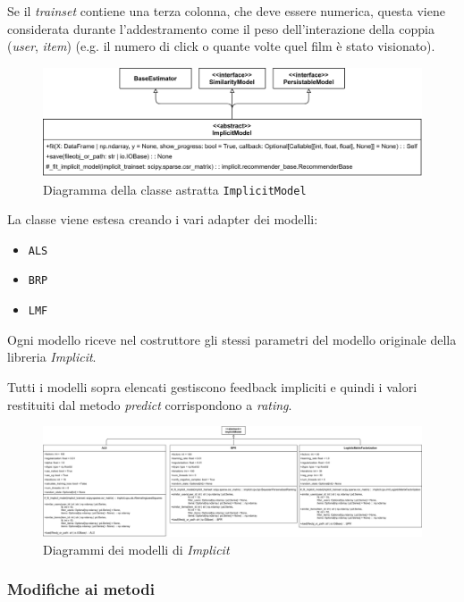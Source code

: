 Se il \textit{trainset} contiene una terza colonna, che deve essere numerica, questa viene considerata durante l'addestramento come il peso dell'interazione della coppia (\textit{user}, \textit{item}) (e.g. il numero di click o quante volte quel film è stato visionato). 

\begin{figure}[H]
    \centering
    \includegraphics[scale=0.15]{figures/UML/models/implicit_model.png}
    \caption{Diagramma della classe astratta \texttt{ImplicitModel}}
\end{figure}

La classe viene estesa creando i vari adapter dei modelli:

\begin{itemize}
    \item \texttt{ALS}
    \item \texttt{BRP}
    \item \texttt{LMF}
\end{itemize}

Ogni modello riceve nel costruttore gli stessi parametri del modello originale della libreria \textit{Implicit}.

Tutti i modelli sopra elencati gestiscono feedback impliciti e quindi i valori restituiti dal metodo \textit{predict} corrispondono a \textit{rating}.

\begin{figure}[H]
    \centering
    \includegraphics[angle=90, scale=0.1]{figures/UML/models/implicit_models.png}
    \caption{Diagrammi dei modelli di \textit{Implicit}}
\end{figure}

\subsubsection{Modifiche ai metodi}

